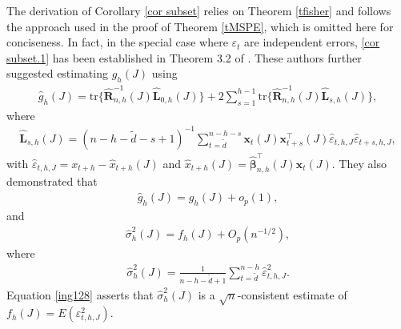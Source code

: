 \documentclass[ejsv2]{imsart}
\theoremstyle{plain}
\theoremstyle{definition}
\theoremstyle{remark}
\begin{document}
The derivation of Corollary \ref{cor subset} relies on Theorem \ref{tfisher} and follows the approach used in the proof of Theorem \ref{tMSPE}, which is omitted here for conciseness.
In fact, in the special case where
$\varepsilon_t$ are independent errors,
\eqref{cor subset.1} has been established
in Theorem 3.2 of \cite{Hsu2019}.
These authors further suggested estimating
$g_{h}(J)$ using
\begin{eqnarray}
\label{ing125}
\hat{g}_h(J)=\mathrm{tr}\{\hat{\mathbf{R}}_{n,h}^{-1}(J)\hat{\mathbf{L}}_{0,h}(J)\}+2\sum_{s=1}^{h-1}
\mathrm{tr}\{\hat{\mathbf{R}}_{n,h}^{-1}(J)\hat{\mathbf{L}}_{s,h}(J)\},
\end{eqnarray}
where
\begin{eqnarray*}
\hat{\mathbf{L}}_{s,h}(J)=(n-h-\tilde{d}-s+1)^{-1}
\sum_{t=\tilde{d}}^{n-h-s}\mathbf{x}_t(J)\mathbf{x}_{t+s}^\top(J)\hat{\varepsilon}_{t,h,J}\hat{\varepsilon}_{t+s,h,J},
\end{eqnarray*}
with $\hat{\varepsilon}_{t,h,J}=x_{t+h}-\hat{x}_{t+h}(J)$ and $\hat{x}_{t+h}(J)=\hat{\bm{\beta}}_{n,h}^\top(J)\mathbf{x}_t(J)
$.
They also demonstrated that
\begin{eqnarray}
\label{ing129}
\hat{g}_{h}(J)=g_h(J) +o_p(1),
\end{eqnarray}
and
\begin{eqnarray}
\label{ing128}
\hat{\sigma}^2_{h}(J)=f_h(J) +O_p(n^{-1/2}),
\end{eqnarray}
where
\begin{eqnarray}
\label{ing124}
\hat{\sigma}^2_{h}(J)=\frac{1}{n-h-\tilde{d}+1}\sum_{t=\tilde{d}}^{n-h}\hat{\varepsilon}_{t,h,J}^2.
\end{eqnarray}
Equation \eqref{ing128} asserts that
$\hat{\sigma}^2_{h}(J)$ is a $\sqrt{n}$-consistent estimate of
$f_h(J)=E(\varepsilon_{t,h,J}^2)$.





 
\end{document}
